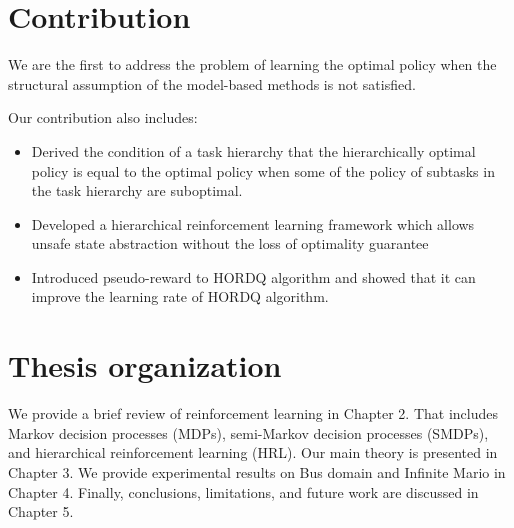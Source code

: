 \section{Contribution}
We are the first to address the problem of learning the optimal policy when
the structural assumption of the model-based methods is not satisfied.

Our contribution also includes: 
\begin{itemize}
\item Derived the condition of a task hierarchy that the hierarchically optimal policy is equal to
      the optimal policy when some of the policy of subtasks in the task hierarchy are suboptimal.
\item Developed a hierarchical reinforcement learning framework which allows unsafe state abstraction
      without the loss of optimality guarantee
\item Introduced pseudo-reward to HORDQ algorithm and showed that it can improve
      the learning rate of HORDQ algorithm. 
\end{itemize}

\section{Thesis organization}
We provide a brief review of reinforcement learning in Chapter 2. 
That includes Markov decision processes (MDPs), semi-Markov decision processes (SMDPs),
and hierarchical reinforcement learning (HRL).
Our main theory is presented in Chapter 3. 
We provide experimental results on Bus domain and Infinite Mario in Chapter 4.
Finally, conclusions, limitations, and future work are discussed in Chapter 5.



